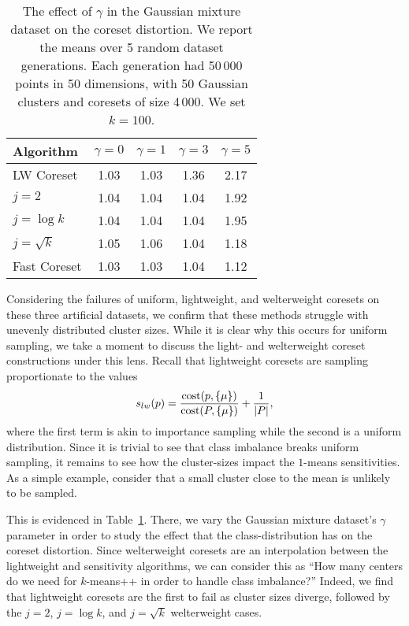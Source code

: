 \begin{table}[htbp]
    \centering
    \begin{tabular}{lcccc}
        Algorithm & $\gamma = 0$ & $\gamma = 1$ & $\gamma = 3$ & $\gamma = 5$\\
        \hline
        LW Coreset & 1.03 & 1.03 & 1.36 & 2.17\\
        $j=2$ & 1.04 & 1.04 & 1.04 & 1.92\\
        $j=\log k$ & 1.04 & 1.04 & 1.04 & 1.95\\
        $j=\sqrt{k}$ & 1.05 & 1.06 & 1.04 & 1.18\\
        Fast Coreset & 1.03 & 1.03 & 1.04 & 1.12
    \end{tabular}
    \caption{The effect of $\gamma$ in the Gaussian mixture dataset on the coreset distortion. We report the means over 5 random dataset generations.
    Each generation had 50\,000 points in 50 dimensions, with 50 Gaussian clusters and coresets of size 4\,000. We set $k=100$.}
        \label{tbl:class-imbalance}
\end{table}



Considering the failures of uniform, lightweight, and welterweight coresets on these three artificial datasets, we confirm that these methods
struggle with unevenly distributed cluster sizes. While it is clear why this occurs for uniform sampling, we take a moment to discuss the light- and
welterweight coreset constructions under this lens. Recall that lightweight coresets are sampling proportionate to the values
\[ s_{lw}(p) = \dfrac{\operatorname{cost}(p, \{\mu\})}{\operatorname{cost}(P, \{\mu\})} + \dfrac{1}{|P|},\]
where the first term is akin to importance sampling while the second is a uniform distribution. Since it is trivial to see that class imbalance breaks uniform
sampling, it remains to see how the cluster-sizes impact the $1$-means sensitivities. As a simple example, consider that a small cluster close to the mean
is unlikely to be sampled. 

This is evidenced in Table~\ref{tbl:class-imbalance}. There, we vary the Gaussian mixture dataset's
$\gamma$ parameter in order to study the effect that the class-distribution has on the coreset distortion. Since welterweight coresets are an interpolation
between the lightweight and sensitivity algorithms, we can consider this as ``How many centers do we need for $k$-means++ in order to handle class imbalance?''
Indeed, we find that lightweight coresets are the first to fail as cluster sizes diverge, followed by the $j=2$, $j=\log k$, and $j=\sqrt{k}$ welterweight
cases.

